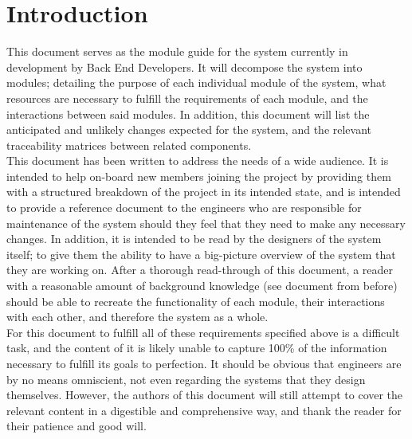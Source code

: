 \documentclass[12pt, titlepage]{article}
\begin{document}
\newpage

\tableofcontents

\listoftables

\listoffigures

\newpage


\section{Introduction}

This document serves as the module guide for the system currently in development by Back End Developers. It will decompose the system into modules; detailing the purpose of each individual module of the system, what resources are necessary to fulfill the requirements of each module, and the interactions between said modules. In addition, this document will list the anticipated and unlikely changes expected for the system, and the relevant traceability matrices between related components. \\

This document has been written to address the needs of a wide audience. It is intended to help on-board new members joining the project by providing them with a structured breakdown of the project in its intended state, and is intended to provide a reference document to the engineers who are responsible for maintenance of the system should they feel that they need to make any necessary changes. In addition, it is intended to be read by the designers of the system itself; to give them the ability to have a big-picture overview of the system that they are working on. After a thorough read-through of this document, a reader with a reasonable amount of background knowledge (see document from before) should be able to recreate the functionality of each module, their interactions with each other, and therefore the system as a whole.\\

For this document to fulfill all of these requirements specified above is a difficult task, and the content of it is likely unable to capture 100\% of the information necessary to fulfill its goals to perfection. It should be obvious that engineers are by no means omniscient, not even regarding the systems that they design themselves. However, the authors of this document will still attempt to cover the relevant content in a digestible and comprehensive way, and thank the reader for their patience and good will.\\
\end{document}
